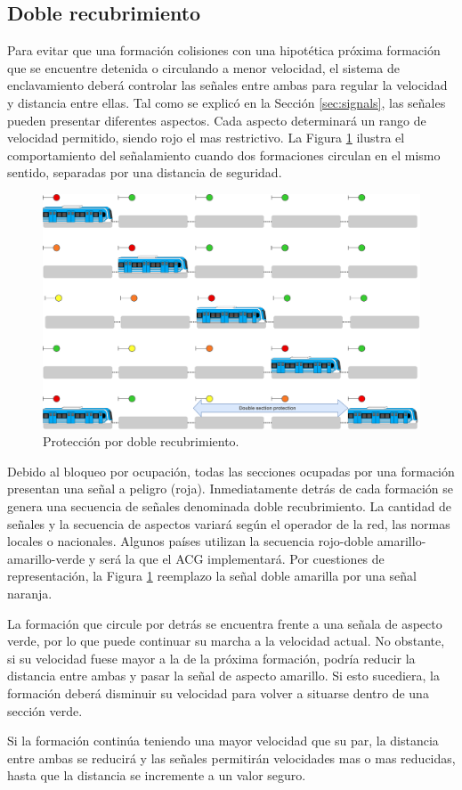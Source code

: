\subsection{Doble recubrimiento}

	Para evitar que una formación colisiones con una hipotética próxima formación que se encuentre detenida o circulando a menor velocidad, el sistema de enclavamiento deberá controlar las señales entre ambas para regular la velocidad y distancia entre ellas. Tal como se explicó en la Sección \ref{sec:signals}, las señales pueden presentar diferentes aspectos. Cada aspecto determinará un rango de velocidad permitido, siendo rojo el mas restrictivo. La Figura \ref{fig:ACG_recrubrimiento_1} ilustra el comportamiento del señalamiento cuando dos formaciones circulan en el mismo sentido, separadas por una distancia de seguridad.
	
	\begin{figure}[!h]
		\centering
		\includegraphics[width=1\textwidth]{Figuras/recubrimiento}
		\centering\caption{Protección por doble recubrimiento.}
		\label{fig:ACG_recrubrimiento_1}
	\end{figure}
	
	Debido al bloqueo por ocupación, todas las secciones ocupadas por una formación presentan una señal a peligro (roja). Inmediatamente detrás de cada formación se genera una secuencia de señales denominada doble recubrimiento. La cantidad de señales y la secuencia de aspectos variará según el operador de la red, las normas locales o nacionales. Algunos países utilizan la secuencia rojo-doble amarillo-amarillo-verde y será la que el ACG implementará. Por cuestiones de representación, la Figura \ref{fig:ACG_recrubrimiento_1} reemplazo la señal doble amarilla por una señal naranja.
	
	La formación que circule por detrás se encuentra frente a una señala de aspecto verde, por lo que puede continuar su marcha a la velocidad actual. No obstante, si su velocidad fuese mayor a la de la próxima formación, podría reducir la distancia entre ambas y pasar la señal de aspecto amarillo. Si esto sucediera, la formación deberá disminuir su velocidad para volver a situarse dentro de una sección verde. 
	
	Si la formación continúa teniendo una mayor velocidad que su par, la distancia entre ambas se reducirá y las señales permitirán velocidades mas o mas reducidas, hasta que la distancia se incremente a un valor seguro.